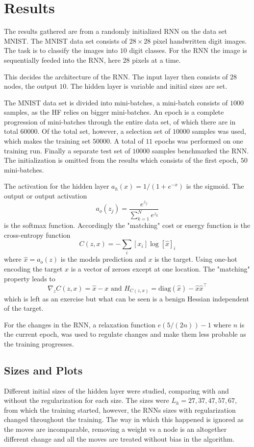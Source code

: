 \chapter{Results}

The results gathered are from a randomly initialized RNN on the data set MNIST. The MNIST data set consists of $28 \times 28$ pixel handwritten digit images. The task is to classify the images into $10$ digit classes. For the RNN the image is sequentially feeded into the RNN, here $28$ pixels at a time. 

This decides the architecture of the RNN. The input layer then consists of $28$ nodes, the output $10$. The hidden layer is variable and initial sizes are set.

The MNIST data set is divided into mini-batches, a mini-batch consists of $1000$ samples, as the HF relies on bigger mini-batches. An epoch is a complete progression of mini-batches through the entire data set, of which there are in total $60 000$. Of the total set, however, a selection set of $10 000$ samples was used, which makes the training set $50000$. A total of $11$ epochs was performed on one training run. Finally a separate test set of $10000$ samples benchmarked the RNN. The initialization is omitted from the results which consists of the first epoch, $50$ mini-batches.

The activation for the hidden layer $a_h(x) = 1/(1 + e^{-x})$ is the sigmoid. The output or output activation \[a_o(z_j) = \frac{e^{z_j}}{\sum_{k=1}^N e^{z_k}}\] is the softmax function. Accordingly the "matching" cost or energy function is the cross-entropy function \[C(z,x) = - \sum_i [x_i] \log [\hat{x}]_i\] where $\hat{x} = a_o(z)$ is the models prediction and $x$ is the target. Using one-hot encoding the target $x$ is a vector of zeroes except at one location. The "matching" property leads to \[\nabla_z C(z,x) = \hat{x} - x \text{ and } H_{C(z,x)} = \text{diag}(\hat{x}) - \hat{x} \hat{x}^\top\] which is left as an exercise but what can be seen is a benign Hessian independent of the target. 

For the changes in the RNN, a relaxation function $e(5/(2n)) - 1$ where $n$ is the current epoch, was used to regulate changes and make them less probable as the training progresses.

\section{Sizes and Plots}

Different initial sizes of the hidden layer were studied, comparing with and without the regularization for each size. The sizes were $L_h = 27, 37, 47, 57, 67$, from which the training started, however, the RNNs sizes with regularization changed throughout the training. The way in which this happened is ignored as the moves are incomparable, removing a weight vs a node is an altogether different change and all the moves are treated without bias in the algorithm. 

